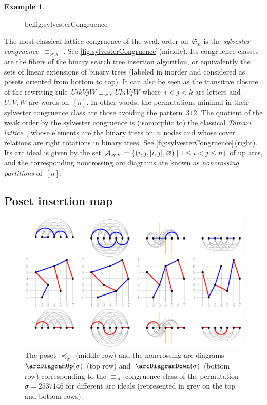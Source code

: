 \documentclass{amsart}
\theoremstyle{definition}
\newtheorem{example}[theorem]{Example}
\newcommand{\f}[1]{{\mathfrak{#1}}} %
\newcommand{\set}[2]{\left\{ #1 \;\middle|\; #2 \right\}} %
\newcommand{\eqdef}{\mbox{\,\raisebox{0.2ex}{\scriptsize\ensuremath{\mathrm:}}\ensuremath{=}\,}} %
\newcommand{\darkblue}{\color{darkblue}} %
\newcommand{\defn}[1]{\textsl{\darkblue #1}} %
\newcommand{\arcs}{{\mathcal{A}}} %
\begin{document}
\begin{example}
\begin{figure}[b]
bel{fig:sylvesterCongruence}
\end{figure}
%
The most classical lattice congruence of the weak order on~$\f{S}_n$ is the \defn{sylvester congruence}~$\equiv_\textrm{sylv}$ \cite{LodayRonco, HivertNovelliThibon-algebraBinarySearchTrees}.
See \cref{fig:sylvesterCongruence}\,(middle).
Its congruence classes are the fibers of the binary search tree insertion algorithm, or equivalently the sets of linear extensions of binary trees (labeled in inorder and considered as posets oriented from bottom to top).
It can also be seen as the transitive closure of the rewriting rule~$U i k V j W \equiv_\textrm{sylv} U k i V j W$ where~$i < j < k$ are letters and~$U,V,W$ are words on~$[n]$.
In other words, the permutations minimal in their sylvester congruence class are those avoiding the pattern~$312$.
The quotient of the weak order by the sylvester congruence is (isomorphic to) the classical \defn{Tamari lattice}~\cite{Tamari}, whose elements are the binary trees on~$n$ nodes and whose cover relations are right rotations in binary trees.
See \cref{fig:sylvesterCongruence}\,(right).
Its arc ideal is given by the set~$\arcs_\textrm{sylv} \eqdef \set{(i, j, {]i,j[}, \varnothing)}{1 \le i < j \le n}$ of up arcs, and the corresponding noncrossing arc diagrams are known as \defn{noncrossing partitions} of~$[n]$.
\end{example}


\subsection{Poset insertion map}
\label{subsec:insertionMap}

\begin{figure}[b]
	\capstart
	\centerline{\includegraphics[scale=.85]{arcDiagramsQuotients}}
	\caption{The poset~$\preccurlyeq_\sigma^\equiv$ (middle row) and the noncrossing arc diagrams~$\arcDiagramUp(\sigma)$ (top row) and~$\arcDiagramDown(\sigma)$ (bottom row) corresponding to the $\equiv_\arcs$-congruence class of the permutation~$\sigma = 2537146$ for different arc ideals (represented in grey on the top and bottom rows).}
	\label{fig:arcDiagramsQuotients}
\end{figure}
\end{document}
